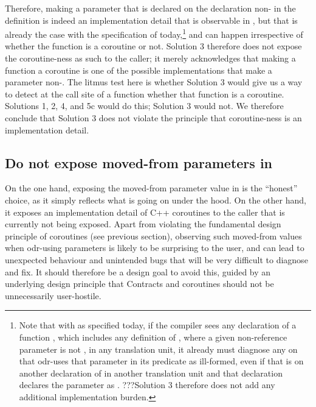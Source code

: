 Therefore, making a parameter that is declared  on the declaration non- in the definition is indeed an implementation detail that is observable in , but that is already the case with the specification of \cite{P2900R8} today,\footnote{Note that with \cite{P2900R8} as specified today, if the compiler sees any declaration of a function , which includes any definition of , where a given non-reference parameter is not , in any translation unit, it already must diagnose any  on  that odr-uses that parameter in its predicate as ill-formed, even if that  is on another declaration of  in another translation unit and that declaration declares the parameter as . ???Solution 3 therefore does not add any additional implementation burden.} and can happen irrespective of whether the function is a coroutine or not. Solution 3 therefore does not expose the coroutine-ness as such to the caller; it merely acknowledges that making a function a coroutine is one of the possible implementations that make a parameter non-. The litmus test here is whether Solution 3 would give us a way to detect at the call site of a function whether that function is a coroutine. Solutions 1, 2, 4, and 5c would do this; Solution 3 would not. We therefore conclude that Solution 3 does not violate the principle that coroutine-ness is an implementation detail.

\subsection{Do not expose moved-from parameters in }

On the one hand, exposing the moved-from parameter value in  is the ``honest'' choice, as it simply reflects what is going on under the hood. On the other hand, it exposes an implementation detail of C++ coroutines to the caller that is currently not being exposed. Apart from violating the fundamental design principle of coroutines (see previous section), observing such moved-from values when odr-using  parameters is likely to be surprising to the user, and can lead to unexpected behaviour and unintended bugs that will be very difficult to diagnose and fix. It should therefore be a design goal to avoid this, guided by an underlying design principle that Contracts and coroutines should not be unnecessarily user-hostile.

